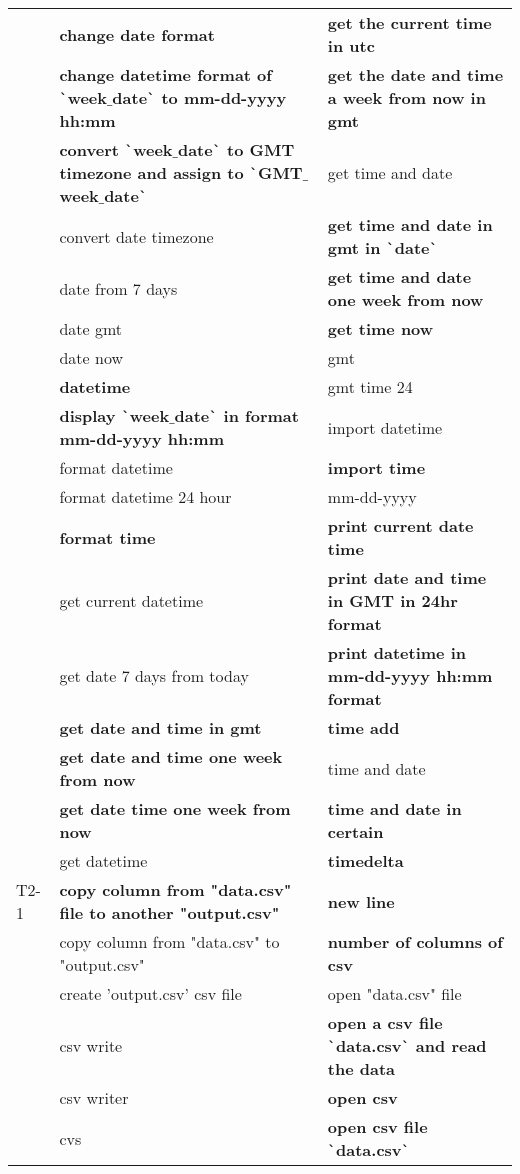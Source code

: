 \begin{longtable}{lLL}
& \textbf{change date format} & \textbf{get the current time in utc} \\
& \textbf{change datetime format of \texttt{\`}week$\_$date\texttt{\`} to mm-dd-yyyy hh:mm} & \textbf{get the date and time a week from now in gmt} \\
& \textbf{convert \texttt{\`}week$\_$date\texttt{\`} to GMT timezone and assign to \texttt{\`}GMT$\_$week$\_$date\texttt{\`}} & get time and date \\
& convert date timezone & \textbf{get time and date in gmt in \texttt{\`}date\texttt{\`}} \\
& date from 7 days & \textbf{get time and date one week from now} \\
& date gmt & \textbf{get time now} \\
& date now & gmt \\
& \textbf{datetime} & gmt time 24 \\
& \textbf{display \texttt{\`}week$\_$date\texttt{\`} in format mm-dd-yyyy hh:mm} & import datetime \\
& format datetime & \textbf{import time} \\
& format datetime 24 hour & mm-dd-yyyy \\
& \textbf{format time} & \textbf{print current date time} \\
& get current datetime & \textbf{print date and time in GMT in 24hr format} \\
& get date 7 days from today & \textbf{print datetime in mm-dd-yyyy hh:mm  format} \\
& \textbf{get date and time in gmt} & \textbf{time add} \\
& \textbf{get date and time one week from now} & time and date \\
& \textbf{get date time one week from now} & \textbf{time and date in certain} \\
& get datetime & \textbf{timedelta} \\
T2-1 & \textbf{copy column from "data.csv" file to another "output.csv"} & \textbf{new line} \\
& copy column from "data.csv" to "output.csv" & \textbf{number of columns of csv} \\
& create 'output.csv' csv file & open "data.csv" file \\
& csv write & \textbf{open a csv file \texttt{\`}data.csv\texttt{\`} and read the data} \\
& csv writer & \textbf{open csv} \\
& cvs & \textbf{open csv file \texttt{\`}data.csv\texttt{\`}} \\

\end{longtable}
